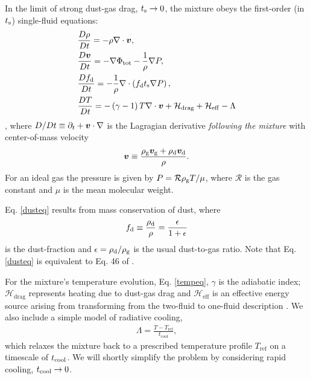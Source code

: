 In the limit of strong dust-gas drag, $t_\mathrm{s}\to0$, the mixture obeys 
the first-order (in $t_\mathrm{s}$) single-fluid equations: 
\begin{align} 
  &\frac{D\rho}{Dt} = -\rho\nabla\cdot\bm{v}, \label{masseq}\\ 
  &\frac{D\bm{v}}{Dt} = - \nabla\Phi_\mathrm{tot} - \frac{1}{\rho}\nabla  P, \label{momeq}\\ 
  &\frac{Df_\mathrm{d}}{Dt} = -\frac{1}{\rho} \nabla \cdot \left(f_\mathrm{d} 
  t_\mathrm{s} \nabla P \right),\label{dusteq}\\
  &\frac{D T}{D t} = - \left(\gamma-1\right)T\nabla\cdot\bm{v} +
  \mathcal{H}_\mathrm{drag} + \mathcal{H}_\mathrm{eff}  - \Lambda  \label{tempeq} 
\end{align}
\citep{laibe14}, where $D/Dt \equiv \partial_t + \bm{v}\cdot\nabla$ is the Lagragian
derivative \emph{following the mixture} with center-of-mass velocity  
\begin{align}
  \bm{v} \equiv \frac{\rho_\mathrm{g}\bm{v}_\mathrm{g} + 
    \rho_\mathrm{d}\bm{v}_\mathrm{d}}{\rho}. 
\end{align}
For an ideal gas the pressure is given
by $P = \mathcal{R}\rho_\mathrm{g} T/\mu $, where $\mathcal{R}$ is
the gas constant and $\mu$ is the mean molecular weight. 

Eq. \ref{dusteq} results from mass conservation of dust, where 
\begin{align}
  f_\mathrm{d} \equiv \frac{\rho_\mathrm{d}}{\rho}  = \frac{\epsilon}{1+\epsilon} 
\end{align}
is the dust-fraction and $\epsilon=\rho_\mathrm{d}/\rho_\mathrm{g}$ is the usual
dust-to-gas ratio. Note that Eq. \ref{dusteq} is 
equivalent to Eq. 46 of \cite{jacquet11}. 

For the mixture's temperature evolution, Eq. \ref{tempeq}, $\gamma$ is
the adiabatic index; $\mathcal{H}_\mathrm{drag}$ represents heating
due to dust-gas drag and $\mathcal{H}_\mathrm{eff}$ is an effective
energy source arising from transforming from the two-fluid to
one-fluid description \citep[see][ for details]{laibe14}. We also
include a simple model of radiative cooling,
\begin{align}
  \Lambda = \frac{T -
    T_\mathrm{ref}}{t_\mathrm{cool}}, \label{realenergy} 
\end{align}
which relaxes the mixture back to a prescribed temperature profile   
$T_\mathrm{ref}$ on a timescale of $t_\mathrm{cool}$. We will shortly simplify
the problem by considering rapid cooling, $t_\mathrm{cool}\to0$. 


